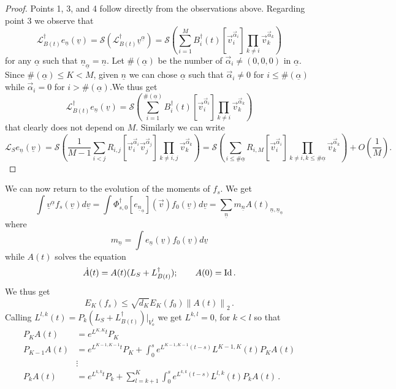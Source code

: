 \documentclass{article}
\newcommand*\cL{ \mathcal{L} }
\newcommand\uv{{\underline v}}
\newcommand\vv{{\vec v}}
\begin{document}
\begin{proof}
Points 1, 3, and 4 follow directly from the observations above. Regarding point 3 we observe that
\[
\cL^\dagger_{B(t)}e_{\underline n}(\uv)=\mathcal S(\cL^\dagger_{B(t)}\uv^{\underline \alpha})=\mathcal S\left(\sum_{i=1}^M B_i^\dagger(t)[\vv_i^{\vec \alpha_i}] \prod_{k\not=i}\vv_k^{\vec \alpha_k}\right)
\]
for any $\underline \alpha$ such that $\underline n_{\underline \alpha}=\underline n$. Let $\#(\underline \alpha)$ be 
the number of $\vec \alpha_i\not =(0,0,0)$ in $\underline \alpha$. Since $\#(\underline \alpha)\leq K<M$, given 
$\underline n$ we can chose $\underline \alpha$ such that $\vec \alpha_i\not=0$ for $i\leq \#(\underline \alpha)$ while 
$\vec \alpha_i=0$ for $i>\#(\underline \alpha)$.We thus get
\[
\cL^\dagger_{B(t)}e_{\underline n}(\uv)=\mathcal S\left(\sum_{i=1}^{\#(\underline\alpha)} B_i^\dagger(t)[\vv_i^{\vec 
\alpha_i}] \prod_{k\not=i}\vv_k^{\vec \alpha_k}\right)
\]
that clearly does not depend on $M$.
Similarly we can write
\[
\cL_{S}e_{\underline n}(\uv)=\mathcal S\left(\frac 1{M-1}\sum_{i<j} R_{i,j}[\vv_i^{\vec \alpha_i}\vv_j^{\vec \alpha_j}] 
\prod_{k\not=i,j}\vv_k^{\vec \alpha_k}\right)=\mathcal S\left(\sum_{i\leq\#{\underline \alpha}} R_{i,M}[\vv_i^{\vec 
\alpha_i}] \prod_{k\not=i,k\leq\#{\underline \alpha} }\vv_k^{\vec \alpha_k}\right)+O\left(\frac1M\right).
\]
\end{proof}

We can now return to the evolution of the moments of $f_s$. 
We get
\[
\int \uv^{\underline\alpha}f_s(\uv)d\uv=\int \Phi_{s,0}^\dagger[e_{{\underline 
n}_{\underline\alpha}}](\vv)f_0(\uv)d\uv=\sum_{\underline n} m_{\underline n} A(t)_{{\underline n},{\underline 
n}_{\underline\alpha}}
\]
where 
\[
m_{\underline n}=\int e_{\underline n}(\uv)f_0(\uv)d\uv
\]
while $A(t)$ solves the equation
\[
\dot{A}(t) = A(t)(L_S + L_{B(t)}^\dagger); \qquad A(0) = \rm Id\, .
\]
We thus get
\[
E_K(f_s)\leq \sqrt{d_K}E_K(f_0)\left\|A(t)\right\|_2\, .
\]
Calling $L^{l,k}(t)=P_k(L_S + L_{B(t)}^\dagger)\big|_{V_o^l}$ we get 
$L^{k,l}=0$, for $k<l$ so that
\begin{equation}\label{eq:recur}
\begin{aligned}
P_KA(t)&=e^{L^{K,K}t}P_K\\
P_{K-1}A(t)&=e^{L^{K-1,K-1}t}P_K+\int_0^s e^{L^{K-1,K-1}(t-s)}L^{K-1,K}(t)P_KA(t)\\
&\vdots\\
P_{k}A(t)&=e^{L^{k,k}t}P_k+\sum_{l=k+1}^K\int_0^s e^{L^{k,k}(t-s)}L^{l,k}(t)P_kA(t)\, .
\end{aligned}
\end{equation}
\end{document}
